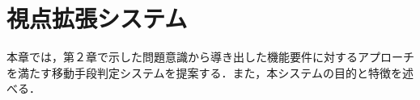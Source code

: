 \chapter{視点拡張システム}
本章では，第２章で示した問題意識から導き出した機能要件に対するアプローチを満たす移動手段判定システムを提案する．また，本システムの目的と特徴を述べる．








